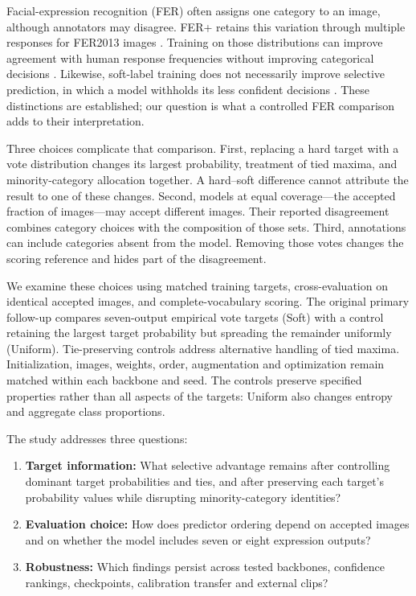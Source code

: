 Facial-expression recognition (FER) often assigns one category to an image, although annotators may disagree. FER+ retains this variation through multiple responses for FER2013 images \cite{goodfellow2013fer,barsoum2016ferplus}. Training on those distributions can improve agreement with human response frequencies without improving categorical decisions \cite{washington2021crowdsourcing}. Likewise, soft-label training does not necessarily improve selective prediction, in which a model withholds its less confident decisions \cite{khurana2024crowd,xia2025smoothing}. These distinctions are established; our question is what a controlled FER comparison adds to their interpretation.

Three choices complicate that comparison. First, replacing a hard target with a vote distribution changes its largest probability, treatment of tied maxima, and minority-category allocation together. A hard--soft difference cannot attribute the result to one of these changes. Second, models at equal coverage---the accepted fraction of images---may accept different images. Their reported disagreement combines category choices with the composition of those sets. Third, annotations can include categories absent from the model. Removing those votes changes the scoring reference and hides part of the disagreement.

We examine these choices using matched training targets, cross-evaluation on identical accepted images, and complete-vocabulary scoring. The original primary follow-up compares seven-output empirical vote targets (Soft) with a control retaining the largest target probability but spreading the remainder uniformly (Uniform). Tie-preserving controls address alternative handling of tied maxima. Initialization, images, weights, order, augmentation and optimization remain matched within each backbone and seed. The controls preserve specified properties rather than all aspects of the targets: Uniform also changes entropy and aggregate class proportions.

The study addresses three questions:
\begin{enumerate}
\item \textbf{Target information:} What selective advantage remains after controlling dominant target probabilities and ties, and after preserving each target's probability values while disrupting minority-category identities?
\item \textbf{Evaluation choice:} How does predictor ordering depend on accepted images and on whether the model includes seven or eight expression outputs?
\item \textbf{Robustness:} Which findings persist across tested backbones, confidence rankings, checkpoints, calibration transfer and external clips?
\end{enumerate}

